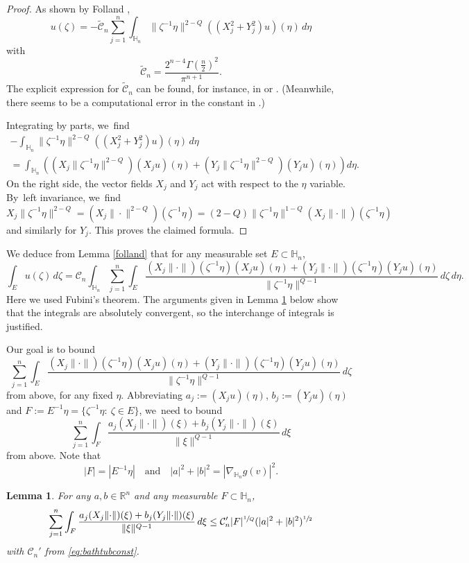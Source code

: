 \documentclass[11pt]{article}
\let\oldsfrac\sfrac
\renewcommand{\sfrac}[2]{{\oldsfrac{#1}{#2}}}
\newtheorem{lemma}[theorem]{Lemma}
\theoremstyle{definition}
\newcommand{\1}{\mathbbm{1}}
\newcommand{\R}{\mathbb{R}}
\numberwithin{equation}{section}
\begin{document}
\begin{proof}
As shown by Folland \cite{Fo0},
\[
u(\zeta) = - \tilde{\mathcal C}_n \sum_{j=1}^n \int_{\mathbb H_n} \|\zeta^{-1} \eta\|^{2-Q} ((X_j^2+Y_j^2) u)(\eta)\,d\eta
\]
with
\[
\tilde{\mathcal C}_n = \frac{2^{n-4}\Gamma(\frac n2)^2}{\pi^{n+1}}.
\]
The explicit expression for $\tilde{\mathcal C}_n$ can be found, for instance, in \cite[Eq.~between (1.2) and (1.3)]{BrFoMo} or \cite[Th.\,1.2]{CoLu}. (Meanwhile, there seems to be a computational error in the constant in \cite[Th.\,5.15]{CaDaPaTy}.)

Integrating by parts, we~find
\begin{multline*}
- \int_{\mathbb H_n} \|\zeta^{-1} \eta\|^{2-Q} ((X_j^2+Y_j^2) u)(\eta)\,d\eta \\
= \int_{\mathbb H_n} \left((X_j \|\zeta^{-1} \eta\|^{2-Q}) (X_j u)(\eta) + (Y_j \|\zeta^{-1} \eta\|^{2-Q}) (Y_j u)(\eta)\right) d\eta.
\end{multline*}
On the right side, the vector fields $X_j$ and $Y_j$ act with respect to the $\eta$ variable. By~left invariance, we~find
\[
X_j \|\zeta^{-1} \eta\|^{2-Q} = (X_j \|{\cdot}\|^{2-Q})(\zeta^{-1}\eta) = (2-Q)\|\zeta^{-1}\eta\|^{1-Q} (X_j\|{\cdot}\|)(\zeta^{-1}\eta)
\]
and similarly for $Y_j$. This proves the claimed formula.
\end{proof}

We deduce from Lemma \ref{folland} that for any measurable set $E\subset\mathbb H_n$,
\[
\int_E u(\zeta)\,d\zeta = \mathcal C_n \int_{\mathbb H_n} \sum_{j=1}^n \int_E \frac{(X_j\|{\cdot}\|)(\zeta^{-1} \eta) (X_ju)(\eta) + (Y_j\|{\cdot}\|)(\zeta^{-1}\eta) (Y_ju)(\eta)}{\|\zeta^{-1} \eta\|^{Q-1}}\,d\zeta \,d\eta.
\]
Here we used Fubini's theorem. The arguments given in Lemma \ref{bathtub} below show that the integrals are absolutely convergent, so the interchange of integrals is justified.

Our goal is to bound
\[
\sum_{j=1}^n \int_E \frac{(X_j\|{\cdot}\|)(\zeta^{-1} \eta) (X_ju)(\eta) + (Y_j\|{\cdot}\|)(\zeta^{-1}\eta) (Y_ju)(\eta)}{\|\zeta^{-1} \eta\|^{Q-1}}\,d\zeta
\]
from above, for any fixed $\eta$. Abbreviating $a_j:=(X_ju)(\eta)$, $b_j:=(Y_ju)(\eta)$ and $F:=E^{-1}\eta=\{ \zeta^{-1} \eta:\ \zeta\in E \}$, we~need to bound
\[
\sum_{j=1}^n \int_F \frac{a_j (X_j\|{\cdot}\|)(\xi) + b_j (Y_j\|{\cdot}\|)(\xi)}{\|\xi\|^{Q-1}}\,d\xi
\]
from above. Note that
\[
|F|=|E^{-1} \eta|
\quad\text{and}\quad
|a|^2+|b|^2 = |\nabla_{\mathbb H_n} g(v)|^2.
\]

\begin{lemma}\label{bathtub}
For any $a,b\in\R^n$ and any measurable $F\subset\mathbb H_n$,
\[
\sum_{j=1}^n \int_F \frac{a_j (X_j\|{\cdot}\|)(\xi) + b_j (Y_j\|{\cdot}\|)(\xi)}{\|\xi\|^{Q-1}}\,d\xi
\leq \mathcal C_n' |F|^\sfrac{1}{Q} (|a|^2+|b|^2)^{\sfrac12}
\]
with $\mathcal C_n'$ from \eqref{eq:bathtubconst}.
\end{lemma}
\end{document}

